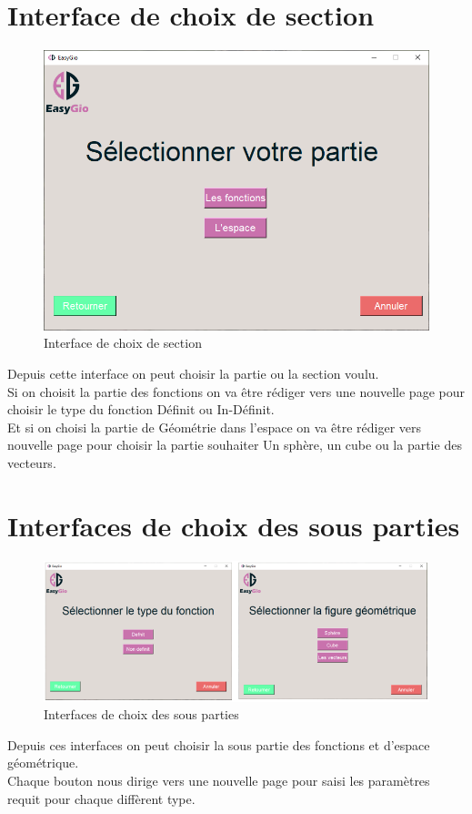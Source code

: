 \documentclass[a4paper]{report}
\begin{document}
\section{Interface de choix de section}
\begin{figure}[!h]
    \centering
    \includegraphics[width=12cm]{images/Interface2.PNG}
    \caption{Interface de choix de section}
    \label{fig:Interface de choix de section}
\end{figure}
Depuis cette interface on peut choisir la partie ou la section voulu.\\
Si on choisit la partie des fonctions on va être rédiger vers une nouvelle page pour choisir le type du fonction Définit ou In-Définit.\\
Et si on choisi la partie de Géométrie dans l'espace on va être rédiger vers nouvelle page pour choisir la partie souhaiter Un sphère, un cube ou la partie des vecteurs.
\section{Interfaces de choix des sous parties}
\begin{figure}[!h]
    \centering
    \includegraphics[width=15cm]{images/TypesCaptures.PNG}
    \caption{Interfaces de choix des sous parties}
    \label{fig:Interfaces de choix des sous parties}
\end{figure}
Depuis ces interfaces on peut choisir la sous partie des fonctions et d'espace géométrique.\\
Chaque bouton nous dirige vers une nouvelle page pour saisi les paramètres requit pour chaque diffèrent type.
\newpage
\end{document}
